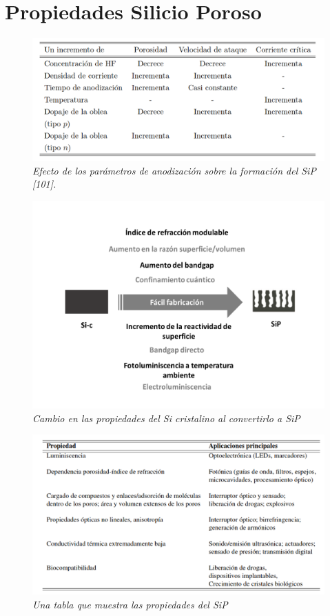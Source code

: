 \documentclass[a4paper,11pt,]{book}
\begin{document}
\section{Propiedades Silicio Poroso}
\begin{figure}[H]
\centering
\includegraphics[scale=.4]{../Images/pp1}
\caption{\emph{Efecto de los parámetros de anodización sobre la formación del SiP [101].}}
\label{fig:pp1}
\end{figure}
\begin{figure}[H]
	\centering
	\includegraphics[scale=.3]{../Images/sil}
	\caption{\emph{Cambio en las propiedades del Si cristalino al convertirlo a SiP}}
	\label{fig:CP12}
\end{figure}

\begin{figure}[H]
	\centering
	\includegraphics[scale=.4]{../Images/propiedades}
	\caption{\emph{Una tabla que muestra las propiedades del SiP}}
	\label{fig:prp}
\end{figure}
\end{document}
